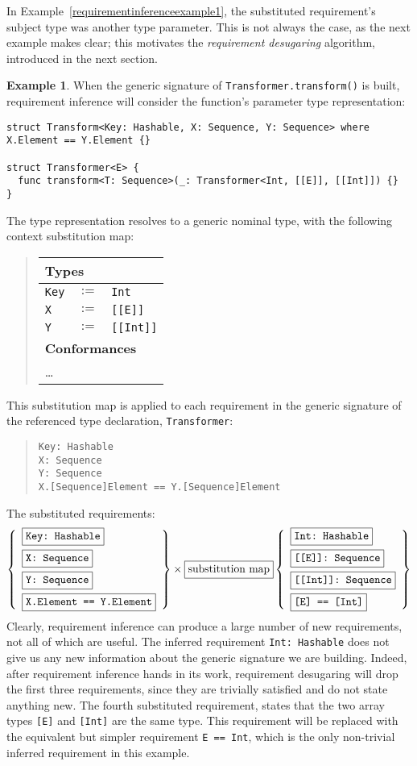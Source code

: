 \documentclass[a4paper,headsepline,bibliography=totoc,toc=flat,fleqn,twoside=semi]{scrbook}
\theoremstyle{definition}
\theoremstyle{definition}
\newtheorem{example}{Example}[chapter]
\theoremstyle{definition}
\newcommand{\mathboxed}[1]{\boxed{\mbox{\vphantom{pI\texttt{pI}}#1}}}
\newcommand{\ttbox}[1]{\boxed{\mbox{\vphantom{pI\texttt{pI}}\texttt{#1}}}}
\newcommand{\SubMapC}[2]{\begin{tabular}{|lll|}
\hline
\multicolumn{3}{|l|}{\textbf{Types}}\\
\hline
#1\\
\hline
\hline
\multicolumn{3}{|l|}{\textbf{Conformances}}\\
\hline
#2\\
\hline
\end{tabular}}
\newcommand{\SubType}[2]{\texttt{#1}&$:=$&\texttt{#2}}
\begin{document}
In Example~\ref{requirementinferenceexample1}, the substituted requirement's subject type was another type parameter. This is not always the case, as the next example makes clear; this motivates the \emph{requirement desugaring} algorithm, introduced in the next section.
\begin{example} When the generic signature of \texttt{Transformer.transform()} is built, requirement inference will consider the function's parameter type representation:
\begin{Verbatim}
struct Transform<Key: Hashable, X: Sequence, Y: Sequence> where X.Element == Y.Element {}

struct Transformer<E> {
  func transform<T: Sequence>(_: Transformer<Int, [[E]], [[Int]]) {}
}
\end{Verbatim}
The type representation resolves to a generic nominal type, with the following context substitution map:
\begin{quote}
\SubMapC{\SubType{Key}{Int}\\
\SubType{X}{[[E]]}\\
\SubType{Y}{[[Int]]}}
{\multicolumn{3}{|l|}{\ldots}}
\end{quote}
This substitution map is applied to each requirement in the generic signature of the referenced type declaration, \texttt{Transformer}:
\begin{quote}
\begin{verbatim}
Key: Hashable
X: Sequence
Y: Sequence
X.[Sequence]Element == Y.[Sequence]Element
\end{verbatim}
\end{quote}
The substituted requirements:
\[
\left\{
\begin{array}{l}
\ttbox{Key:\ Hashable}\\[\medskipamount]
\ttbox{X:\ Sequence}\\[\medskipamount]
\ttbox{Y:\ Sequence}\\[\medskipamount]
\ttbox{X.Element == Y.Element}
\end{array}
\right\}
\times
\mathboxed{substitution map}
\left\{
\begin{array}{l}
\ttbox{Int:\ Hashable}\\[\medskipamount]
\ttbox{[[E]]:\ Sequence}\\[\medskipamount]
\ttbox{[[Int]]:\ Sequence}\\[\medskipamount]
\ttbox{[E] == [Int]}
\end{array}
\right\}
\]
Clearly, requirement inference can produce a large number of new requirements, not all of which are useful. The inferred requirement \texttt{Int:\ Hashable} does not give us any new information about the generic signature we are building. Indeed, after requirement inference hands in its work, requirement desugaring will drop the first three requirements, since they are trivially satisfied and do not state anything new. The fourth substituted requirement, states that the two array types \texttt{[E]} and \texttt{[Int]} are the same type. This requirement will be replaced with the equivalent but simpler requirement \texttt{E == Int}, which is the only non-trivial inferred requirement in this example.
\end{example}
\end{document}

